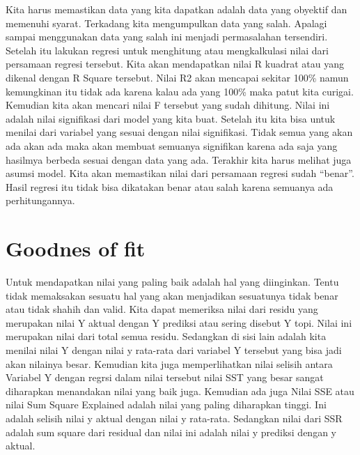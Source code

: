 \documentclass[
]{book}
\theoremstyle{definition}
\theoremstyle{definition}
\theoremstyle{definition}
\theoremstyle{definition}
\theoremstyle{remark}
\begin{document}
Kita harus memastikan data yang kita dapatkan adalah data yang obyektif dan memenuhi syarat. Terkadang kita mengumpulkan data yang salah. Apalagi sampai menggunakan data yang salah ini menjadi permasalahan tersendiri.
Setelah itu lakukan regresi untuk menghitung atau mengkalkulasi nilai dari persamaan regresi tersebut. Kita akan mendapatkan nilai R kuadrat atau yang dikenal dengan R Square tersebut. Nilai R2 akan mencapai sekitar 100\% namun kemungkinan itu tidak ada karena kalau ada yang 100\% maka patut kita curigai. Kemudian kita akan mencari nilai F tersebut yang sudah dihitung. Nilai ini adalah nilai signifikasi dari model yang kita buat.
Setelah itu kita bisa untuk menilai dari variabel yang sesuai dengan nilai signifikasi. Tidak semua yang akan ada akan ada maka akan membuat semuanya signifikan karena ada saja yang hasilmya berbeda sesuai dengan data yang ada.
Terakhir kita harus melihat juga asumsi model. Kita akan memastikan nilai dari persamaan regresi sudah ``benar''. Hasil regresi itu tidak bisa dikatakan benar atau salah karena semuanya ada perhitungannya.

\hypertarget{goodnes-of-fit}{%
\section{Goodnes of fit}\label{goodnes-of-fit}}

Untuk mendapatkan nilai yang paling baik adalah hal yang diinginkan. Tentu tidak memaksakan sesuatu hal yang akan menjadikan sesuatunya tidak benar atau tidak shahih dan valid. Kita dapat memeriksa nilai dari residu yang merupakan nilai Y aktual dengan Y prediksi atau sering disebut Y topi. Nilai ini merupakan nilai dari total semua residu. Sedangkan di sisi lain adalah kita menilai nilai Y dengan nilai y rata-rata dari variabel Y tersebut yang bisa jadi akan nilainya besar. Kemudian kita juga memperlihatkan nilai selisih antara Variabel Y dengan regrsi dalam nilai tersebut nilai SST yang besar sangat diharapkan menandakan nilai yang baik juga. Kemudian ada juga Nilai SSE atau nilai Sum Square Explained adalah nilai yang paling diharapkan tinggi. Ini adalah selisih nilai y aktual dengan nilai y rata-rata. Sedangkan nilai dari SSR adalah sum square dari residual dan nilai ini adalah nilai y prediksi dengan y aktual.
\end{document}
